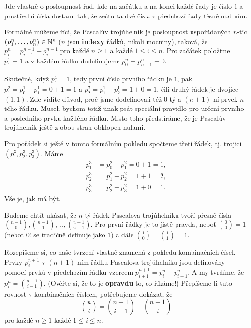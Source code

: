 Jde vlastně o posloupnost řad, kde na začátku a na konci každé řady je číslo $1$
a prostřední čísla dostanu tak, že sečtu ta dvě čísla z předchozí řady těsně nad
ním.

Formálně můžeme říci, že Pascalův trojúhelník je posloupnost uspořádaných
$n$-tic $(p_1^{n},\ldots,p_n^{n}) \in \mathbb{N}^{n}$ ($n$ jsou \textbf{indexy} řádků,
nikoli mocniny), taková, že $p_i^{n} = p_{i-1}^{n-1} + p_{i}^{n-1}$ pro každé $n
\geq 1$ a každé $1 \leq i \leq n$. Pro začátek položíme $p_1^{1} = 1$ a v každém
řádku dodefinujeme $p_{0}^{n} = p_{n+1}^{n} = 0$.

Skutečně, když $p_1^{1} = 1$, tedy první číslo prvního řádku je $1$, pak
$p_1^{2} = p_0^{1} + p_1^{1} = 0 + 1 = 1$ a $p_2^{2} = p_1^{1} + p_2^{1} = 1 + 0
= 1$, čili druhý řádek je dvojice $(1, 1)$. Zde vidíte důvod, proč jsme
dodefinovali též $0$-tý a $(n+1)$-ní prvek $n$-tého řádku. Museli bychom totiž
jinak psát speciální pravidlo pro určení prvního a posledního prvku každého
řádku. Místo toho předstíráme, že je Pascalův trojúhelník ještě z obou stran
obklopen nulami.

Pro pořádek si ještě v tomto formálním pohledu spočteme třetí řádek, tj. trojici
$(p_1^{3},p_2^{3},p_3^3)$. Máme
\begin{align*}
 p_1^3&= p_0^2+p_1^2 = 0 + 1 = 1, \\
 p_2^3&= p_1^{2}+p_2^2 = 1 + 1 = 2, \\
 p_3^3&= p_2^2 + p_3^2 = 1 + 0 = 1.
\end{align*}
Vše je, jak má být.

Budeme chtít ukázat, že $n$-tý řádek Pascalova trojúhelníku tvoří přesně čísla
$\binom{n-1}{0},\binom{n-1}{1},\ldots,\binom{n-1}{n-1}$. Pro první řádky je to
jistě pravda, neboť $\binom{0}{0} = 1$ (neboť $0!$ se tradičně definuje jako
$1$) a dále $\binom{1}{0} = \binom{1}{1} = 1$.

Rozepíšeme si, co naše tvrzení vlastně znamená z pohledu kombinačních čísel.
Prvky $p_i^{n+1}$ v $(n+1)$-ním řádku Pascalova trojúhelníku jsou definovány
pomocí prvků v předchozím řádku vzorcem $p_{i+1}^{n+1} = p_{i}^{n} +
p_{i+1}^{n}$. A my tvrdíme, že $p_{i}^{n} = \binom{n-1}{i-1}$. (Ověřte si, že to
je \textbf{opravdu} to, co říkáme!) Přepíšeme-li tuto rovnost v kombinačních
číslech, potřebujeme dokázat, že
\begin{equation*}
 \label{eq:pascal-identity}
 \tag{$*$}
 \binom{n}{i} = \binom{n-1}{i-1} + \binom{n-1}{i}
\end{equation*}
pro každé $n \geq 1$ každé $1 \leq i \leq n$.

